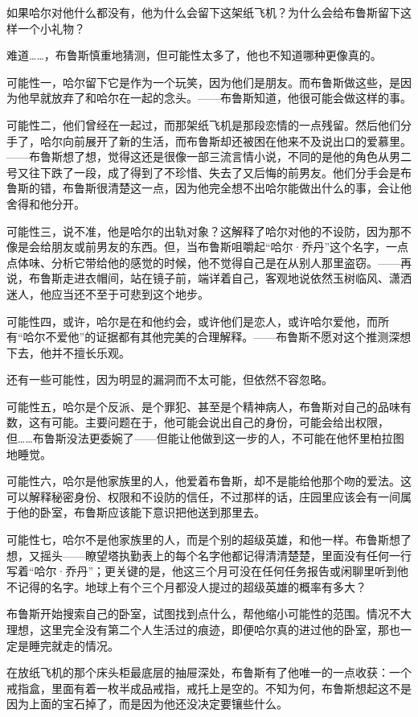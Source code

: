 \documentclass[../main.tex]{subfiles}
\begin{document}
如果哈尔对他什么都没有，他为什么会留下这架纸飞机？为什么会给布鲁斯留下这样一个小礼物？

难道……，布鲁斯慎重地猜测，但可能性太多了，他也不知道哪种更像真的。

可能性一，哈尔留下它是作为一个玩笑，因为他们是朋友。而布鲁斯做这些，是因为他早就放弃了和哈尔在一起的念头。——布鲁斯知道，他很可能会做这样的事。

可能性二，他们曾经在一起过，而那架纸飞机是那段恋情的一点残留。然后他们分手了，哈尔向前展开了新的生活，而布鲁斯却还被困在他来不及说出口的爱慕里。——布鲁斯想了想，觉得这还是很像一部三流言情小说，不同的是他的角色从男二号又往下跌了一段，成了得到了不珍惜、失去了又后悔的前男友。他们分手会是布鲁斯的错，布鲁斯很清楚这一点，因为他完全想不出哈尔能做出什么的事，会让他舍得和他分开。

可能性三，说不准，他是哈尔的出轨对象？这解释了哈尔对他的不设防，因为那不像是会给朋友或前男友的东西。但，当布鲁斯咀嚼起“哈尔·乔丹”这个名字，一点点体味、分析它带给他的感觉的时候，他不觉得自己是在从别人那里盗窃。——再说，布鲁斯走进衣帽间，站在镜子前，端详着自己，客观地说依然玉树临风、潇洒迷人，他应当还不至于可悲到这个地步。

可能性四，或许，哈尔是在和他约会，或许他们是恋人，或许哈尔爱他，而所有“哈尔不爱他”的证据都有其他完美的合理解释。——布鲁斯不愿对这个推测深想下去，他并不擅长乐观。

还有一些可能性，因为明显的漏洞而不太可能，但依然不容忽略。

可能性五，哈尔是个反派、是个罪犯、甚至是个精神病人，布鲁斯对自己的品味有数，这有可能。主要问题在于，他可能会说出自己的身份，可能会给出权限，但……布鲁斯没法更委婉了——但能让他做到这一步的人，不可能在他怀里柏拉图地睡觉。

可能性六，哈尔是他家族里的人，他爱着布鲁斯，却不是能给他那个吻的爱法。这可以解释秘密身份、权限和不设防的信任，不过那样的话，庄园里应该会有一间属于他的卧室，布鲁斯应该能下意识把他送到那里去。

可能性七，哈尔不是他家族里的人，而是个别的超级英雄，和他一样。布鲁斯想了想，又摇头——瞭望塔执勤表上的每个名字他都记得清清楚楚，里面没有任何一行写着“哈尔·乔丹”；更关键的是，他这三个月可没在任何任务报告或闲聊里听到他不记得的名字。地球上有个三个月都没人提过的超级英雄的概率有多大？

布鲁斯开始搜索自己的卧室，试图找到点什么，帮他缩小可能性的范围。情况不大理想，这里完全没有第二个人生活过的痕迹，即便哈尔真的进过他的卧室，那也一定是睡完就走的情况。

在放纸飞机的那个床头柜最底层的抽屉深处，布鲁斯有了他唯一的一点收获：一个戒指盒，里面有着一枚半成品戒指，戒托上是空的。不知为何，布鲁斯想起这不是因为上面的宝石掉了，而是因为他还没决定要镶些什么。
\end{document}
